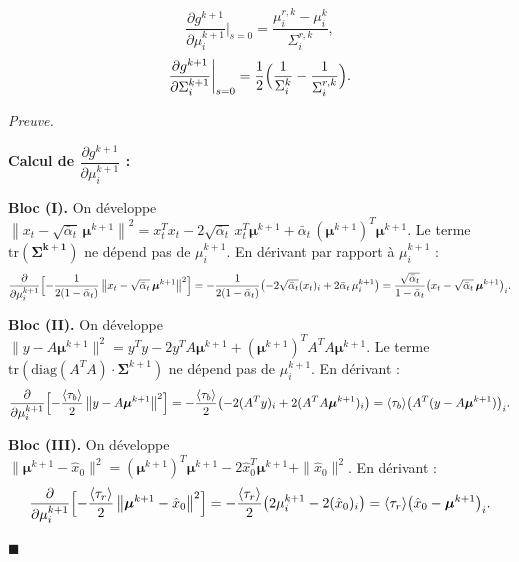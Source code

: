\documentclass[12pt]{article}
\newcommand{\alt}{\bar\alpha_t}
\renewcommand{\qedsymbol}{$\blacksquare$}
\renewenvironment{proof}[1][\proofname]{%
  \par\medskip\noindent
  \textit{\color{proofgray}#1.}\enspace\ignorespaces
}{\hfill\qedsymbol\par\medskip}
\renewcommand{\proofname}{Preuve}
\begin{document}
\begin{propositionbox}
\label{prop:dg_order1}
\begin{equation}
\frac{\partial g^{k+1}}{\partial \mu_i^{k+1}}\bigg|_{s=0} = \frac{\mu_i^{r,k} - \mu_i^k}{\Sigma_i^{r,k}},
\label{eq:dg_dmu}
\end{equation}
\begin{equation}
\frac{\partial g^{k+1}}{\partial \Sigma_i^{k+1}}\bigg|_{s=0} = \frac{1}{2}\Bigl(\frac{1}{\Sigma_i^k} - \frac{1}{\Sigma_i^{r,k}}\Bigr).
\label{eq:dg_dSigma}
\end{equation}
\end{propositionbox}

\begin{proof}

\textbf{Calcul de $\dfrac{\partial g^{k+1}}{\partial \mu_i^{k+1}}$ :}

\medskip
\textbf{Bloc (I).} On développe $\left\|x_t - \sqrt{\alt}\,\boldsymbol{\mu}^{k+1}\right\|^2 = x_t^Tx_t - 2\sqrt{\alt}\,x_t^T\boldsymbol{\mu}^{k+1} + \alt\,(\boldsymbol{\mu}^{k+1})^T\boldsymbol{\mu}^{k+1}$. Le terme $\mathrm{tr}(\boldsymbol{\Sigma^{k+1}})$ ne dépend pas de $\mu_i^{k+1}$. En dérivant par rapport à $\mu_i^{k+1}$ :
\begin{equation*}
\frac{\partial}{\partial \mu_i^{k+1}}\Bigl[-\frac{1}{2(1-\alt)}\left\|x_t - \sqrt{\alt}\,\boldsymbol{\mu}^{k+1}\right\|^2\Bigr] = -\frac{1}{2(1-\alt)}\bigl(-2\sqrt{\alt}(x_t)_i + 2\alt\,\mu_i^{k+1}\bigr) = \frac{\sqrt{\alt}}{1-\alt}\bigl(x_t - \sqrt{\alt}\,\boldsymbol{\mu}^{k+1}\bigr)_i.
\end{equation*}

\textbf{Bloc (II).} On développe $\|y - A\boldsymbol{\mu}^{k+1}\|^2 = y^Ty - 2y^TA\boldsymbol{\mu}^{k+1} + (\boldsymbol{\mu}^{k+1})^TA^TA\boldsymbol{\mu}^{k+1}$. Le terme $\mathrm{tr}(\mathrm{diag}(A^TA)\cdot\boldsymbol{\Sigma}^{k+1})$ ne dépend pas de $\mu_i^{k+1}$. En dérivant :
\begin{equation*}
\frac{\partial}{\partial \mu_i^{k+1}}\Bigl[-\frac{\langle\tau_b\rangle}{2}\left\|y - A\boldsymbol{\mu}^{k+1}\right\|^2\Bigr] = -\frac{\langle\tau_b\rangle}{2}\bigl(-2(A^Ty)_i + 2(A^TA\boldsymbol{\mu}^{k+1})_i\bigr) = \langle\tau_b\rangle\bigl(A^T(y - A\boldsymbol{\mu}^{k+1})\bigr)_i.
\end{equation*}

\textbf{Bloc (III).} On développe $\|\boldsymbol{\mu}^{k+1} - \hat{x}_0\|^2 = (\boldsymbol{\mu}^{k+1})^T\boldsymbol{\mu}^{k+1} - 2\hat{x}_0^T\boldsymbol{\mu}^{k+1} + \|\hat{x}_0\|^2$. En dérivant :
\begin{equation*}
\frac{\partial}{\partial \mu_i^{k+1}}\Bigl[-\frac{\langle\tau_r\rangle}{2}\left\|\boldsymbol{\mu}^{k+1} - \hat{x}_0\right\|^2\Bigr] = -\frac{\langle\tau_r\rangle}{2}\bigl(2\mu_i^{k+1} - 2(\hat{x}_0)_i\bigr) = \langle\tau_r\rangle\bigl(\hat{x}_0 - \boldsymbol{\mu}^{k+1}\bigr)_i.
\end{equation*}


\end{proof}
\end{document}
